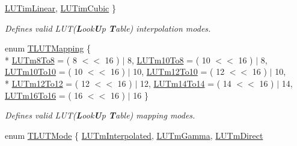 \begin{DoxyCompactItemize}
\hyperlink{group___common_interface_gga40d5450344b3aaaf127544ef3985cfbbae321531249291aa722d209310d088430}{L\+U\+Tim\+Linear}, 
\hyperlink{group___common_interface_gga40d5450344b3aaaf127544ef3985cfbba5a37c0ceccef5667d8a3d6c91a514717}{L\+U\+Tim\+Cubic}
 \}
\begin{DoxyCompactList}\small\item\em Defines valid L\+U\+T({\bfseries L}ook{\bfseries U}p {\bfseries T}able) interpolation modes. \end{DoxyCompactList}\item 
enum \hyperlink{group___common_interface_ga161dbf21975385f4cd6bd555fd39298c}{T\+L\+U\+T\+Mapping} \{ \\*
\hyperlink{group___common_interface_gga161dbf21975385f4cd6bd555fd39298cae97ca10b4046cbb3c1bfbddf9e4da18c}{L\+U\+Tm8\+To8} = ( 8 $<$$<$ 16 ) $\vert$ 8, 
\hyperlink{group___common_interface_gga161dbf21975385f4cd6bd555fd39298ca94cead73d295aa9c8caadecc9fb3b759}{L\+U\+Tm10\+To8} = ( 10 $<$$<$ 16 ) $\vert$ 8, 
\hyperlink{group___common_interface_gga161dbf21975385f4cd6bd555fd39298ca335045adc1454f5949ac53f6a5d24633}{L\+U\+Tm10\+To10} = ( 10 $<$$<$ 16 ) $\vert$ 10, 
\hyperlink{group___common_interface_gga161dbf21975385f4cd6bd555fd39298cab4bf9857b718e5d8cfe834d8d62adacd}{L\+U\+Tm12\+To10} = ( 12 $<$$<$ 16 ) $\vert$ 10, 
\\*
\hyperlink{group___common_interface_gga161dbf21975385f4cd6bd555fd39298ca0efa4e89e97f45ba648404b78560679f}{L\+U\+Tm12\+To12} = ( 12 $<$$<$ 16 ) $\vert$ 12, 
\hyperlink{group___common_interface_gga161dbf21975385f4cd6bd555fd39298ca1a16ff6b79c3ef3813d2a2798e2fc07f}{L\+U\+Tm14\+To14} = ( 14 $<$$<$ 16 ) $\vert$ 14, 
\hyperlink{group___common_interface_gga161dbf21975385f4cd6bd555fd39298ca9fb50985fe1a3020d09cbc15d5410e55}{L\+U\+Tm16\+To16} = ( 16 $<$$<$ 16 ) $\vert$ 16
 \}
\begin{DoxyCompactList}\small\item\em Defines valid L\+U\+T({\bfseries L}ook{\bfseries U}p {\bfseries T}able) mapping modes. \end{DoxyCompactList}\item 
enum \hyperlink{group___common_interface_ga622d4fe4aa7b262752e9101c78f87f57}{T\+L\+U\+T\+Mode} \{ \hyperlink{group___common_interface_gga622d4fe4aa7b262752e9101c78f87f57ac163fa75ceb235ebfe344a9cdb70fc61}{L\+U\+Tm\+Interpolated}, 
\hyperlink{group___common_interface_gga622d4fe4aa7b262752e9101c78f87f57a7d07fe5ac753ed62eddd71fbc5483550}{L\+U\+Tm\+Gamma}, 
\hyperlink{group___common_interface_gga622d4fe4aa7b262752e9101c78f87f57a592d6b088911e6974709ba3efb2ad1e8}{L\+U\+Tm\+Direct}
$$
\end{DoxyCompactItemize}

